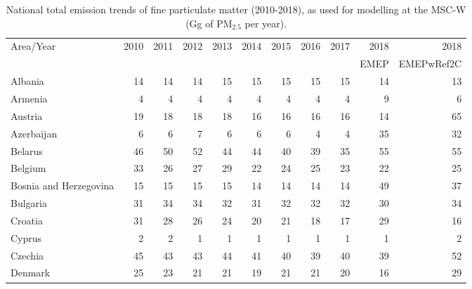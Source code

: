  \begin{table}
 \caption{National total emission trends of fine particulate matter (2010-2018), as used for modelling at the MSC-W (Gg of PM$_{2.5}$ per year).}
 
 \vspace{15pt}
 
 \scriptsize
 \centering
 \begin{tabular}{|l|r|r|r|r|r|r|r|r|r|r|}
 \hline
                     Area/Year&   2010&   2011&   2012&   2013&   2014&   2015&   2016&   2017&   2018& 2018\\
                     &&&&&&&&&EMEP&EMEPwRef2C\\\hline\hline
                       Albania&     14&     14&     14&     15&     15&     15&     15&     15&     14&     13\\\hline
                       Armenia&      4&      4&      4&      4&      4&      4&      4&      4&      9&      6\\\hline
                       Austria&     19&     18&     18&     18&     16&     16&     16&     16&     14&     65\\\hline
                    Azerbaijan&      6&      6&      7&      6&      6&      6&      4&      4&     35&     32\\\hline
                       Belarus&     46&     50&     52&     44&     44&     40&     39&     35&     55&     55\\\hline
                       Belgium&     33&     26&     27&     29&     22&     24&     25&     23&     22&     25\\\hline
        Bosnia and Herzegovina&     15&     15&     15&     15&     14&     14&     14&     14&     49&     37\\\hline
                      Bulgaria&     31&     34&     34&     32&     31&     32&     32&     32&     30&     34\\\hline
                       Croatia&     31&     28&     26&     24&     20&     21&     18&     17&     29&     16\\\hline
                        Cyprus&      2&      2&      1&      1&      1&      1&      1&      1&      1&      2\\\hline
                       Czechia&     45&     43&     43&     44&     41&     40&     39&     40&     39&     52\\\hline
                       Denmark&     25&     23&     21&     21&     19&     21&     21&     20&     16&     29\\\hline

\end{tabular}
\end{table}
